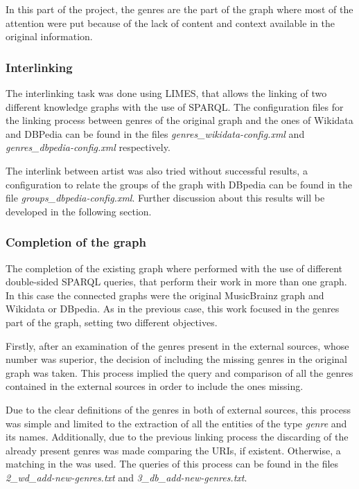 In this part of the project, the genres are the part of the graph where most of the attention were put because of the lack of content and context available in the original information.

\subsubsection{Interlinking}
The interlinking task was done using LIMES, that allows the linking of two different knowledge graphs with the use of SPARQL. The configuration files for the linking process between genres of the original graph and the ones of Wikidata and DBPedia can be found in the files \textit{genres\_wikidata-config.xml} and \textit{genres\_dbpedia-config.xml} respectively.  

The interlink between artist was also tried without successful results, a configuration to relate the groups of the graph with DBpedia can be found in the file \textit{groups\_dbpedia-config.xml}. Further discussion about this results will be developed in the following section.

\subsubsection{Completion of the graph}
The completion of the existing graph where performed with the use of different double-sided SPARQL queries, that perform their work in more than one graph. 
In this case the connected graphs were the original MusicBrainz graph and Wikidata or DBpedia.
As in the previous case, this work focused in the genres part of the graph, setting two different objectives. 

Firstly, after an examination of the genres present in the external sources, whose number was superior, the decision of including the missing genres in the original graph was taken.
This process implied the query and comparison of all the genres contained in the external sources in order to include the ones missing.  

Due to the clear definitions of the genres in both of external sources, this process was simple and limited to the extraction of all the entities of the type \textit{genre} and its names.
Additionally, due to the previous linking process the discarding of the already present genres was made comparing the URIs, if existent. Otherwise, a matching in the was used.
The queries of this process can be found in the files \textit{2\_wd\_add-new-genres.txt} and \textit{3\_db\_add-new-genres.txt}. 

